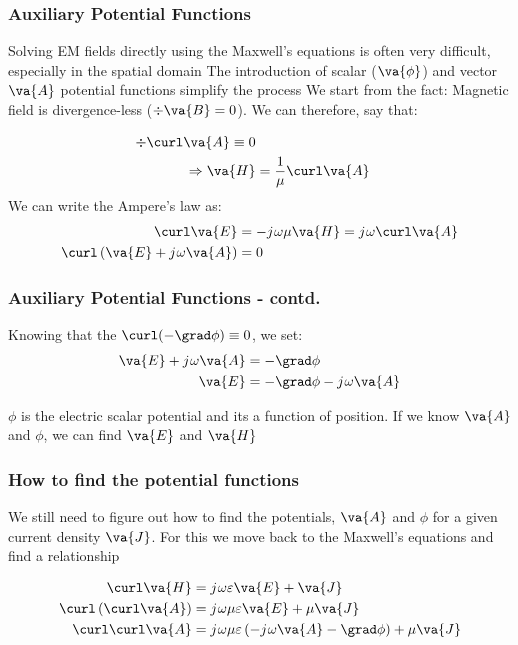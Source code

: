 \documentclass[10pt, compress]{beamer}
\renewcommand{\O}{\omega}  %
\newcommand{\E}{\varepsilon}  %
\renewcommand{\u}{\mu}  %
\renewcommand{\j}{{j}\mkern1mu} %
\begin{document}
\begin{frame}
  \frametitle{Auxiliary Potential Functions}
  \begin{outline}
    \1 Solving EM fields directly using the Maxwell's equations is often very difficult, especially in the spatial domain
    \1 The introduction of scalar ($\va{\phi}$) and vector $\va{A}$ potential functions simplify the process
    \1 We start from the fact:
    \2 Magnetic field is divergence-less ($\div \va{B} = 0$). We can therefore, say that:
  \end{outline}
  \begin{align*}
    \div \curl \va{A} \equiv 0 \\
    \Rightarrow \va{H} &= \frac{1}{\u} \curl \va{A}
  \end{align*}
  We can write the Ampere's law as:
  \begin{align*}
    \curl \va{E} &= - \j \O \u \va{H} = \j \O \curl \va{A} \\
    \curl \left (\va{E} + \j \O \va{A} \right) &= 0
  \end{align*}
\end{frame}

\begin{frame}
  \frametitle{Auxiliary Potential Functions - contd.}
  Knowing that the $\curl (-\grad \phi) \equiv 0 $, we set:
  \begin{align*}
    \va{E} + \j \O \va{A} &= -\grad \phi \\
    \va{E} &= -\grad \phi - \j \O \va{A}
  \end{align*}
\begin{outline}
  \1 $\phi$ is the electric scalar potential and its a function of position.
  \1 If we know $\va{A}$ and $\phi$, we can find $\va{E}$ and $\va{H}$
\end{outline}
\end{frame}


\begin{frame}
  \frametitle{How to find the potential functions}
  
  \begin{outline}
    \1 We still need to figure out how to find the potentials,   $\va{A}$ and $\phi$ for a given current density $\va{J}$.
    \1 For this we move back to the Maxwell's equations and find a relationship
  \end{outline}

  \begin{align*}
     \curl \va{H} &= \j \O \E \va{E} + \va{J} \\
     \curl \left( \curl \va{A} \right) &= \j \O \u \E \va{E} + \u \va{J} \\
     \curl \curl \va{A} &= \j \O \u \E \left(-\j \O \va{A} - \grad \phi \right) + \u \va{J}
  \end{align*}
\end{frame}
\end{document}
